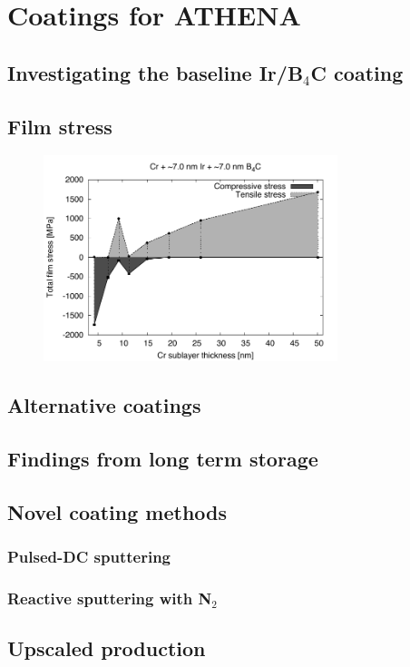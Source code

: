 \chapter{Coatings for ATHENA}

\section{Investigating the baseline Ir/B$_4$C coating}
\section{Film stress}
\begin{figure}[htbp]
  \centering
    \includegraphics[height=6cm]{figures/athena/stress_ir_b4c.pdf}
  \caption{}
  \label{fig:stress_irb4c}
\end{figure}

\section{Alternative coatings}
\section{Findings from long term storage}
\section{Novel coating methods}
\subsection{Pulsed-DC sputtering}

\subsection{Reactive sputtering with N$_2$}

\section{Upscaled production}

